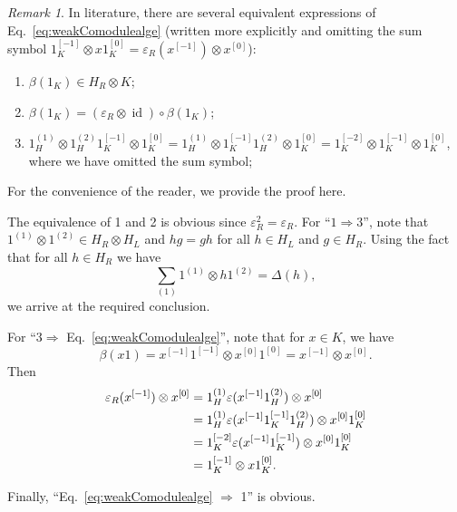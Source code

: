 \documentclass[a4paper,11pt]{article}
\theoremstyle{theorem}
\theoremstyle{remark}
\newtheorem{remark}{Remark}[section]
\newcommand{\id}{\operatorname{id}}
\begin{document}
\begin{remark}
In literature, there are several equivalent expressions of Eq.~\eqref{eq:weakComodulealge} (written more explicitly and omitting the sum symbol $1_K^{[-1]} \otimes x 1_K^{[0]} = \varepsilon_R(x^{[-1]}) \otimes x^{[0]}$):
\begin{enumerate}
    \item $\beta(1_K)\in H_R\otimes K$;
    \item $\beta(1_K)=(\varepsilon_R \otimes \id ) \circ \beta(1_K)$;
    \item $1_H^{(1)} \otimes 1_H^{(2)}1_K^{[-1]}\otimes 1_K^{[0]}=1_H^{(1)} \otimes 1_K^{[-1]} 1_H^{(2)}\otimes 1_K^{[0]}=1_K^{[-2]}\otimes 1_K^{[-1]}\otimes 1_K^{[0]}$, where we have omitted the sum symbol;
\end{enumerate}
For the convenience of the reader, we provide the proof here. 

The equivalence of 1 and 2 is obvious since \( \varepsilon_R^2 = \varepsilon_R \). For ``\( 1 \Rightarrow 3 \)'', note that \( 1^{(1)} \otimes 1^{(2)} \in H_R \otimes H_L \) and \( hg = gh \) for all \( h \in H_L \) and \( g \in H_R \). Using the fact that for all \( h \in H_R \) we have 
\begin{equation}
   \sum_{(1)} 1^{(1)} \otimes h 1^{(2)} = \Delta(h),
\end{equation}
we arrive at the required conclusion.

For ``\( 3 \Rightarrow \) Eq.~\eqref{eq:weakComodulealge}'', note that for \( x \in K \), we have 
\begin{equation}
    \beta(x1) = x^{[-1]} 1^{[-1]} \otimes x^{[0]} 1^{[0]} = x^{[-1]} \otimes x^{[0]}.
\end{equation}
Then 
\begin{align}
    \varepsilon_R(x^{[-1]}) \otimes x^{[0]} 
    &= 1_H^{(1)} \varepsilon(x^{[-1]} 1_H^{(2)}) \otimes x^{[0]} \notag \\
    &= 1_H^{(1)} \varepsilon(x^{[-1]} 1_K^{[-1]} 1_H^{(2)}) \otimes x^{[0]} 1_K^{[0]} \notag \\
    &= 1_K^{[-2]} \varepsilon(x^{[-1]} 1_K^{[-1]}) \otimes x^{[0]} 1_K^{[0]} \notag \\
    &= 1_K^{[-1]} \otimes x 1_K^{[0]}.
\end{align}

Finally, ``Eq.~\eqref{eq:weakComodulealge} \( \Rightarrow \) 1'' is obvious.
  \end{remark}
  
\end{document}
